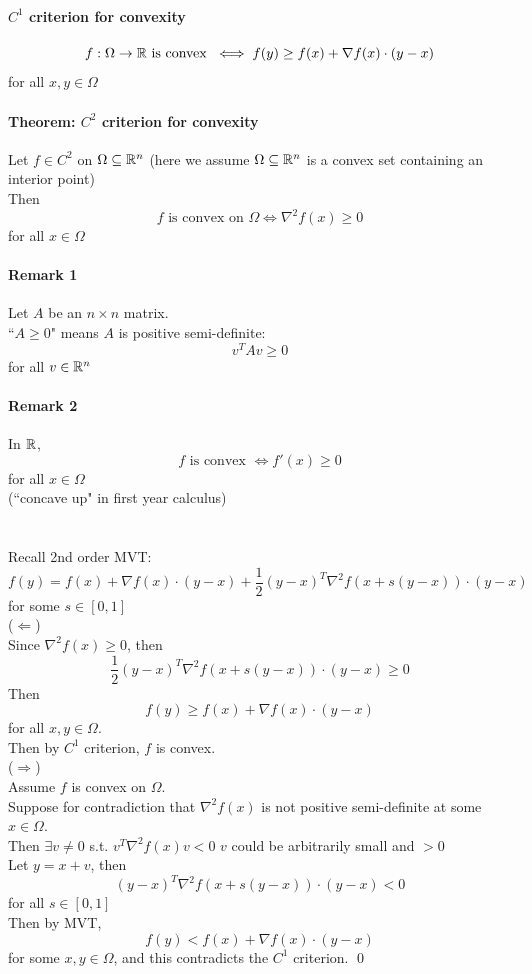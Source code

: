 \documentclass[11pt]{article}
\begin{document}
\paragraph{$C^1$ criterion for convexity}
$$f: \Omega \rightarrow \mathbb{R} \text{ is convex } \iff f(y) \geq f(x) + \nabla f(x) \cdot (y-x)$$
for all $x, y \in \Omega$

\paragraph{Theorem: $C^2$ criterion for convexity}
Let $f \in C^2$ on $\Omega \subseteq \mathbb{R}^n$ (here we assume $\Omega \subseteq \mathbb{R}^n$ is a convex set containing an interior point) \\
Then $$f \text{ is convex on } \Omega \iff \nabla^2 f(x) \geq 0$$ for all $x \in \Omega$


\paragraph{Remark 1}
Let $A$ be an $n \times n$ matrix.\\
``$A \geq 0$" means $A$ is positive semi-definite:
$$v^TAv \geq 0$$ for all $v \in \mathbb{R}^n$

\paragraph{Remark 2}
In $\mathbb{R}$, 
$$f \text{ is convex } \iff f'(x) \geq 0$$ for all $x \in \Omega$ \\
(``concave up" in first year calculus) \\\\
 \\
Recall 2nd order MVT: \\
$$f(y) = f(x) + \nabla f(x)\cdot (y-x) + \frac{1}{2}(y-x)^T \nabla^2 f(x+s(y-x))\cdot (y-x)$$
for some $s \in [0,1]$ \\
($\Leftarrow$) \\
Since $\nabla^2 f(x) \geq 0$, then 
$$\frac{1}{2}(y-x)^T \nabla^2 f(x+s(y-x))\cdot (y-x) \geq 0$$
Then
$$f(y) \geq f(x) + \nabla f(x) \cdot (y-x)$$
for all $x, y \in \Omega$. \\
Then by $C^1$ criterion,
$f$ is convex. \\
($\Rightarrow$) \\
Assume $f$ is convex on $\Omega$. \\
Suppose for contradiction that $\nabla^2 f(x)$ is not positive semi-definite at some $x \in \Omega$. \\
Then $\exists v \neq 0$ s.t. $v^T \nabla^2f(x) v < 0$
$v$ could be arbitrarily small and $>0$\\
Let $y = x + v$, then
$$(y-x)^T\nabla^2 f(x + s(y-x))\cdot (y-x) < 0$$
for all $s \in [0,1]$ \\
Then by MVT,
$$f(y) < f(x) + \nabla f(x)\cdot(y-x)$$
for some $x, y \in \Omega$, and this contradicts the $C^1$ criterion. \qed
\end{document}
